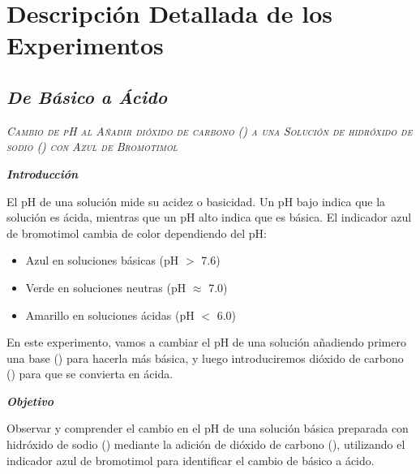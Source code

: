 \chapter{Descripción Detallada de los Experimentos}\label{app:Experimentos}

\section{\textit{\textbf{De Básico a Ácido}}} 
\textit{\textsc{Cambio de pH al Añadir dióxido de carbono () a una Solución de hidróxido de sodio () con Azul de Bromotimol }}

    \textit{\textbf{Introducción  }}
    
    El pH de una solución mide su acidez o basicidad. Un pH bajo indica que la solución es ácida, mientras que un pH alto indica que es básica. El indicador azul de bromotimol cambia de color dependiendo del pH:
    
    \begin{itemize}
        \item Azul en soluciones básicas (pH $>$ 7.6)
        \item Verde en soluciones neutras (pH $\approx$ 7.0)
        \item Amarillo en soluciones ácidas (pH $<$ 6.0)
    \end{itemize} 

    En este experimento, vamos a cambiar el pH de una solución añadiendo primero una base () para hacerla más básica, y luego introduciremos dióxido de carbono () para que se convierta en ácida.
    
    \textit{\textbf{Objetivo  }}
    
    Observar y comprender el cambio en el pH de una solución básica preparada con hidróxido de sodio () mediante la adición de dióxido de carbono (), utilizando el indicador azul de bromotimol para identificar el cambio de básico a ácido.
    
